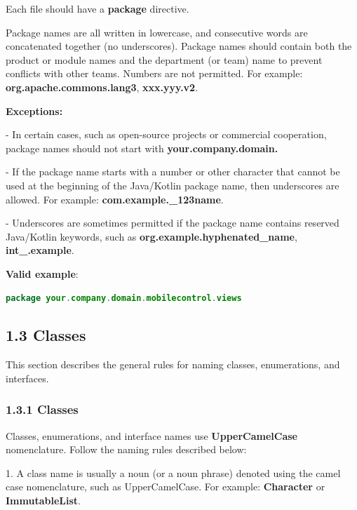 {{{{{{{{Each file should have a \textbf{package} directive.

Package names are all written in lowercase, and consecutive words are concatenated together (no underscores). Package names should contain both the product or module names and the department (or team) name to prevent conflicts with other teams.  Numbers are not permitted. For example: \textbf{org.apache.commons.lang3}, \textbf{xxx.yyy.v2}.



\textbf{Exceptions:} 



- In certain cases, such as open-source projects or commercial cooperation, package names should not start with \textbf{your.company.domain.}

- If the package name starts with a number or other character that cannot be used at the beginning of the Java/Kotlin package name, then underscores are allowed. For example: \textbf{com.example._123name}.

- Underscores are sometimes permitted if the package name contains reserved Java/Kotlin keywords, such as \textbf{org.example.hyphenated_name}, \textbf{int_.example}.



\textbf{Valid example}: 

\begin{lstlisting}[language=Kotlin]
package your.company.domain.mobilecontrol.views
\end{lstlisting}


\subsection*{\textbf{1.3 Classes}}

\label{sec:1.3}

This section describes the general rules for naming classes, enumerations, and interfaces.

\subsubsection*{\textbf{1.3.1 Classes}}
\leavevmode\newline

\label{sec:1.3.1}

Classes, enumerations, and interface names use \textbf{UpperCamelCase} nomenclature. Follow the naming rules described below:

1.	A class name is usually a noun (or a noun phrase) denoted using the camel case nomenclature, such as UpperCamelCase. For example: \textbf{Character} or \textbf{ImmutableList}.

}}}}}}}}
